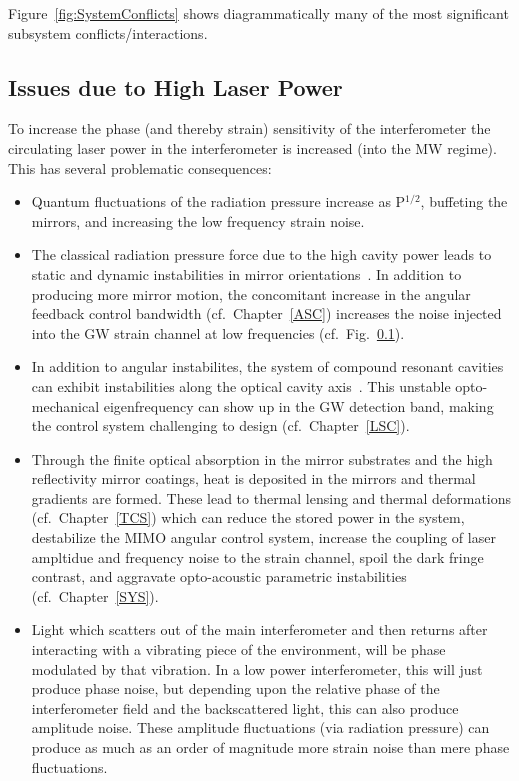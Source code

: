 Figure~\ref{fig:SystemConflicts} shows diagrammatically many of the most
significant subsystem conflicts/interactions.

\subsection{Issues due to High Laser Power}
To increase the phase (and thereby strain) sensitivity of the interferometer
the circulating laser power in the interferometer is increased (into the MW
regime). This has several problematic consequences:
\begin{itemize}
\item Quantum fluctuations of the radiation pressure increase as P$^{1/2}$,
  buffeting the mirrors, and increasing the low frequency strain noise.
\item The classical radiation pressure force due to the high cavity
  power leads to static and dynamic instabilities in mirror
  orientations~\cite{Sidles:2006un, Dooley:13, aLIGO:ASC}. In addition
  to producing more mirror motion, the concomitant increase in the angular feedback control bandwidth (cf.~Chapter~\ref{ASC}) increases the noise injected into the GW strain channel at low frequencies (cf.~Fig.~\ref{}).
\item In addition to angular instabilites, the system of compound
  resonant cavities can exhibit instabilities along the optical cavity
  axis~\cite{SGLMW2004, BuCh2002, Osamu:spring}. This unstable opto-mechanical eigenfrequency can show up in the GW detection band, making the control system challenging to design (cf.~Chapter~\ref{LSC}).
\item Through the finite optical absorption in the mirror substrates
  and the high reflectivity mirror coatings, heat is deposited in the
  mirrors and thermal gradients are formed. These lead to thermal
  lensing and thermal deformations (cf.~Chapter~\ref{TCS}) which can
  reduce the stored power in the system, destabilize the MIMO angular
  control system, increase the coupling of laser ampltidue and
  frequency noise to the strain channel, spoil the dark fringe
  contrast, and aggravate opto-acoustic parametric instabilities (cf.~Chapter~\ref{SYS}).
\item Light which scatters out of the main interferometer and then returns
  after interacting with a vibrating piece of the environment, will be phase
  modulated by that vibration. In a low power interferometer, this will just
  produce phase noise, but depending upon the relative phase of the
  interferometer field and the backscattered light, this can also produce
  amplitude noise. These amplitude fluctuations (via radiation pressure) can
  produce as much as an order of magnitude more strain noise than mere
  phase fluctuations.

\end{itemize}

